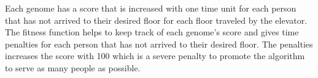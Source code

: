 





Each genome has a score that is increased with one time unit for each person that has not arrived to their desired floor for each floor traveled by the elevator. The fitness function helps to keep track of each genome's score and gives time penalties for each person that has not arrived to their desired floor. The penalties increases the score with 100 which is a severe penalty to promote the algorithm to serve as many people as possible.

